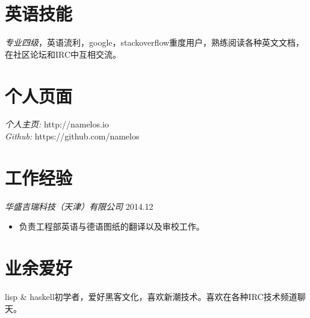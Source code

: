 \documentclass[margin, 12pt]{res} %
\begin{document}
\begin{resume}
\section{英语技能}
{\sl 专业四级}，英语流利，google，stackoverflow重度用户，熟练阅读各种英文文档，在社区论坛和IRC中互相交流。

\section{个人页面}
{\sl 个人主页:} http://namelos.io \\
{\sl Github:} https://github.com/namelos

\section{工作经验}
{\sl 华盛吉瑞科技（天津）有限公司} \hfill 2014.12 \\
\begin{itemize} \itemsep -2pt
  \item 负责工程部英语与德语图纸的翻译以及审校工作。
\end{itemize}

\section{业余爱好}
lisp \& haskell初学者，爱好黑客文化，喜欢新潮技术。喜欢在各种IRC技术频道聊天。

\end{resume}
\end{document}
